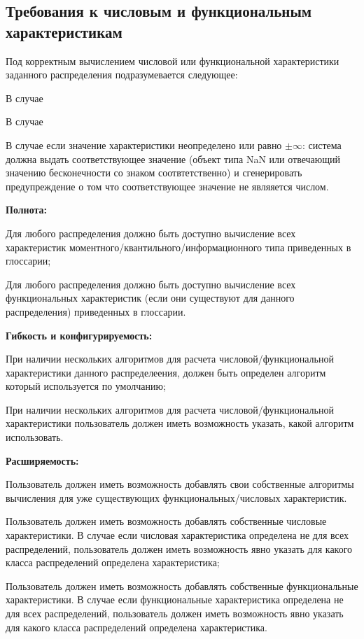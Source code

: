 \subsection{Требования к числовым и функциональным характеристикам}

Под корректным вычислением числовой или функциональной характеристики заданного распределения подразумевается следующее:
\begin{itemizecmp}
    \item В случае
    \item В случае
    \item В случае если значение характеристики неопределено или равно $\pm \infty$: система должна выдать соответствующее значение (объект типа NaN или отвечающий значению бесконечности со знаком соотвтетственно) и сгенерировать предупреждение о том что соответствующее значение не являяется числом.
\end{itemizecmp}

\textbf{Полнота:}
\begin{itemizecmp}
    \item Для любого распределения должно быть доступно вычисление всех характеристик моментного/квантильного/информационного типа приведенных в глоссарии;
    \item Для любого распределения должно быть доступно вычисление всех функциональных характеристик (если они существуют для данного распределения) приведенных в глоссарии.
\end{itemizecmp}

\textbf{Гибкость и конфигурируемость:}
\begin{itemizecmp}
    \item При наличии нескольких алгоритмов для расчета числовой/функциональной характеристики данного распределеения, должен быть определен алгоритм который используется по умолчанию;
    \item При наличии нескольких алгоритмов для расчета числовой/функциональной характеристики пользователь должен иметь возможность указать, какой алгоритм использовать.
\end{itemizecmp}

\textbf{Расширяемость:}
\begin{itemizecmp}
    \item Пользователь должен иметь возможность добавлять свои собственные алгоритмы вычисления для уже существующих функциональных/числовых характеристик.
    \item Пользователь должен иметь возможность добавлять собственные числовые характеристики. В случае если числовая характеристика определена не для всех распределений, пользователь должен иметь возможность явно указать для какого класса распределений определена характеристика;
    \item Пользователь должен иметь возможность добавлять собственные функциональные характеристики. В случае если функциональные характеристика определена не для всех распределений, пользователь должен иметь возможность явно указать для какого класса распределений определена характеристика.
\end{itemizecmp}


